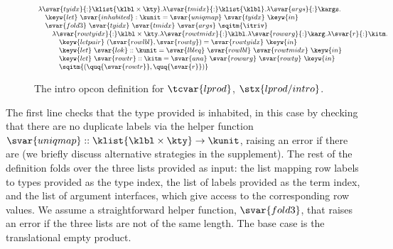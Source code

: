 \begin{figure}
$\small
\begin{array}{l}
\lambda\svar{tyidx}{:}\klist{\klbl\times\kty}.\lambda\svar{tmidx}{:}\klist{\klbl}.\lambda\svar{args}{:}\kargs.\\
\quad \keyw{let}~\svar{inhabited}:\kunit=\svar{uniqmap}~\svar{tyidx}~\keyw{in}\\
\quad \svar{fold3}~\svar{tyidx}~\svar{tmidx}~\svar{args}~\sqitm{\itriv}\\
\quad\quad \lambda \svar{rowtyidx}{:}\klbl\times\kty.\lambda \svar{rowtmidx}{:}\klbl.\lambda\svar{rowarg}{:}\karg.\lambda \svar{r}{:}\kitm.\\
\quad\quad\quad \keyw{letpair}~(\svar{rowlbl}, \svar{rowty})=\svar{rowtyidx} ~\keyw{in}\\
\quad\quad\quad \keyw{let}~\svar{lok}::\kunit=\svar{lbleq}~\svar{rowlbl} ~\svar{rowtmidx}~\keyw{in}\\
\quad\quad\quad \keyw{let}~\svar{rowtr} :: \kitm = \svar{ana}~\svar{rowarg}~\svar{rowty}~\keyw{in}\\
\quad\quad\quad \sqitm{(\quq{\svar{rowtr}}, \quq{\svar{r}})
}\end{array}$
\caption{The intro opcon definition for $\tcvar{lprod}$, $\stx{lprod/intro}$.}
\label{fig:lprod-intro}
\end{figure}

The first line checks that the type provided is inhabited, in this case by checking that there are no duplicate labels via the helper function $\svar{uniqmap} :: \klist{\klbl \times \kty}\rightarrow \kunit$, raising an error if there are (we briefly discuss alternative strategies in the supplement).  %
The rest of the definition folds over the three lists provided as input: the list mapping row labels to types provided as the type index, the list of labels provided as the term index, and the list of argument interfaces, which give access to the corresponding row values. We assume a straightforward helper function, $\svar{fold3}$, that raises an error if the three lists are not of the same length. The base case is the translational empty product. 

